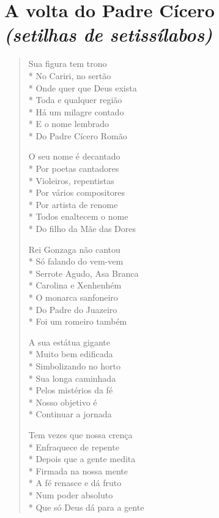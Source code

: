 \chapter[A volta do Padre Cícero]{A volta do Padre Cícero\\\smallskip\textit{(setilhas de setissílabos)}}

\begin{verse}
Sua figura tem trono\\*
No Cariri, no sertão\\*
Onde quer que Deus exista\\*
Toda e qualquer região\\*
Há um milagre contado\\*
E o nome lembrado\\*
Do Padre Cícero Romão

O seu nome é decantado\\*
Por poetas cantadores\\*
Violeiros, repentistas\\*
Por vários compositores\\*
Por artista de renome\\*
Todos enaltecem o nome\\*
Do filho da Mãe das Dores

Rei Gonzaga não cantou\\*
Só falando do vem-vem\\*
Serrote Agudo, Asa Branca\\*
Carolina e Xenhenhém\\*
O monarca sanfoneiro\\*
Do Padre do Juazeiro\\*
Foi um romeiro também

A sua estátua gigante\\*
Muito bem edificada\\*
Simbolizando no horto\\*
Sua longa caminhada\\*
Pelos mistérios da fé\\*
Nosso objetivo é\\*
Continuar a jornada

Tem vezes que nossa crença\\*
Enfraquece de repente\\*
Depois que a gente medita\\*
Firmada na nossa mente\\*
A fé renasce e dá fruto\\*
Num poder absoluto\\*
Que só Deus dá para a gente


\end{verse}
